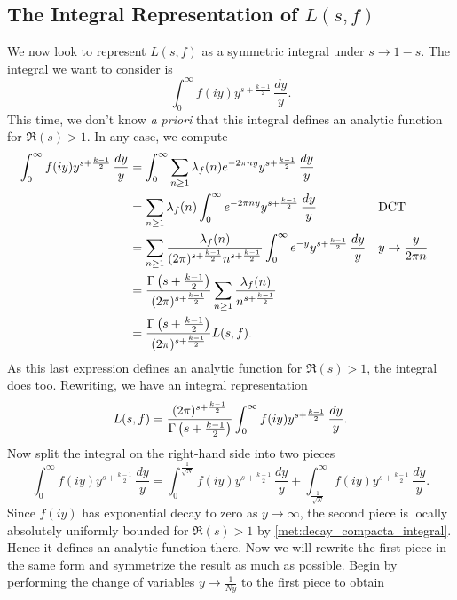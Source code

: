     \subsection*{The Integral Representation of \texorpdfstring{$L(s,f)$}{L(s,f)}}
      We now look to represent $L(s,f)$ as a symmetric integral under $s \to 1-s$. The integral we want to consider is
      \[
        \int_{0}^{\infty}f(iy)y^{s+\frac{k-1}{2}}\,\frac{dy}{y}.
      \]
      This time, we don't know \textit{a priori} that this integral defines an analytic function for $\Re(s) > 1$. In any case, we compute
      \begin{align*}
        \int_{0}^{\infty}f(iy)y^{s+\frac{k-1}{2}}\,\frac{dy}{y} &= \int_{0}^{\infty}\sum_{n \ge 1}\lambda_{f}(n)e^{-2\pi ny}y^{s+\frac{k-1}{2}}\,\frac{dy}{y} \\
        &= \sum_{n \ge 1}\lambda_{f}(n)\int_{0}^{\infty}e^{-2\pi ny}y^{s+\frac{k-1}{2}}\,\frac{dy}{y} &&\text{DCT} \\
        &= \sum_{n \ge 1}\frac{\lambda_{f}(n)}{(2\pi)^{s+\frac{k-1}{2}}n^{s+\frac{k-1}{2}}}\int_{0}^{\infty}e^{-y}y^{s+\frac{k-1}{2}}\,\frac{dy}{y} &&\text{$y \to \frac{y}{2\pi n}$} \\
        &= \frac{\Gamma\left(s+\frac{k-1}{2}\right)}{(2\pi)^{s+\frac{k-1}{2}}}\sum_{n \ge 1}\frac{\lambda_{f}(n)}{n^{s+\frac{k-1}{2}}} \\
        &= \frac{\Gamma\left(s+\frac{k-1}{2}\right)}{(2\pi)^{s+\frac{k-1}{2}}}L(s,f).
      \end{align*}
      As this last expression defines an analytic function for $\Re(s) > 1$, the integral does too. Rewriting, we have an integral representation
      \begin{equation}\label{equ:integral_representation_L-function_1}
        L(s,f) = \frac{(2\pi)^{s+\frac{k-1}{2}}}{\Gamma\left(s+\frac{k-1}{2}\right)}\int_{0}^{\infty}f(iy)y^{s+\frac{k-1}{2}}\,\frac{dy}{y}.
      \end{equation}
      Now split the integral on the right-hand side into two pieces
      \begin{equation}\label{equ:symmetric_integral_L-function_split}
        \int_{0}^{\infty}f(iy)y^{s+\frac{k-1}{2}}\,\frac{dy}{y} = \int_{0}^{\frac{1}{\sqrt{N}}}f(iy)y^{s+\frac{k-1}{2}}\,\frac{dy}{y}+\int_{\frac{1}{\sqrt{N}}}^{\infty}f(iy)y^{s+\frac{k-1}{2}}\,\frac{dy}{y}.
      \end{equation}
      Since $f(iy)$ has exponential decay to zero as $y \to \infty$, the second piece is locally absolutely uniformly bounded for $\Re(s) > 1$ by \cref{met:decay_compacta_integral}. Hence it defines an analytic function there. Now we will rewrite the first piece in the same form and symmetrize the result as much as possible. Begin by performing the change of variables $y \to \frac{1}{Ny}$ to the first piece to obtain
